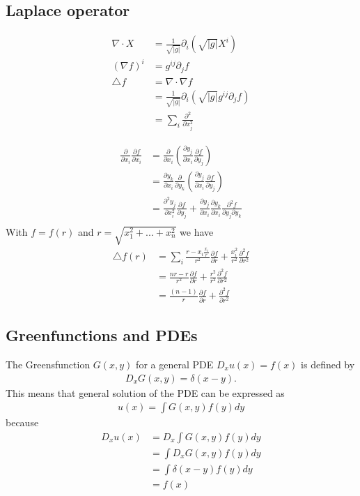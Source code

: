 \documentclass[10pt,a4paper]{article}
\theoremstyle{definition}
\begin{document}
\subsection{Laplace operator}
\begin{align}
    \nabla\cdot X&=\frac{1}{\sqrt{|g|}}\partial_i\left(\sqrt{|g|}X^i\right)\\
    (\nabla f)^i&=g^{ij}\partial_jf\\
    \triangle f &= \nabla\cdot\nabla f\\
    &=\frac{1}{\sqrt{|g|}}\partial_i\left(\sqrt{|g|} g^{ij}\partial_jf \right)\\
    &= \sum_i \frac{\partial^2}{\partial x_j^2}
\end{align}

\begin{align}
    \frac{\partial}{\partial x_i}\frac{\partial f}{\partial x_i}
    &=\frac{\partial}{\partial x_i}\left(\frac{\partial y_j}{\partial x_i}\frac{\partial f}{\partial y_j}\right)\\
    &=\frac{\partial y_k}{\partial x_i}\frac{\partial}{\partial y_k}\left(\frac{\partial y_j}{\partial x_i}\frac{\partial f}{\partial y_j}\right)\\
    &=\frac{\partial^2 y_j}{\partial x_i^2}\frac{\partial f}{\partial y_j} + \frac{\partial y_j}{\partial x_i}\frac{\partial y_k}{\partial x_i}\frac{\partial^2 f}{\partial y_j\partial y_k}\\
\end{align}
With $f=f(r)$ and $r=\sqrt{x_1^2+...+x_n^2}$ we have
\begin{align}
    \triangle f(r)
    &=\sum_i \frac{r-x_i \frac{x_i}{r}}{r^2}\frac{\partial f}{\partial r}+\frac{x_i^2}{r^2}\frac{\partial^2 f}{\partial r^2}\\
    &= \frac{nr-r}{r^2}\frac{\partial f}{\partial r}+\frac{r^2}{r^2}\frac{\partial^2 f}{\partial r^2}\\
    &= \frac{(n-1)}{r}\frac{\partial f}{\partial r}+\frac{\partial^2 f}{\partial r^2}
\end{align}



\subsection{Greenfunctions and PDEs}
The Greensfunction $G(x,y)$ for a general PDE $D_x u(x) = f(x)$ is defined by
\begin{align}
    D_x G(x,y) = \delta(x-y).
\end{align}
This means that general solution of the PDE can be expressed as
\begin{align}
    u(x)=\int G(x,y)f(y)dy
\end{align}
because
\begin{align}
    D_x u(x)
    &=D_x \int G(x,y)f(y)dy\\
    &=\int D_x G(x,y)f(y)dy\\
    &=\int \delta(x-y) f(y)dy\\
    &=f(x)
\end{align}
\end{document}
